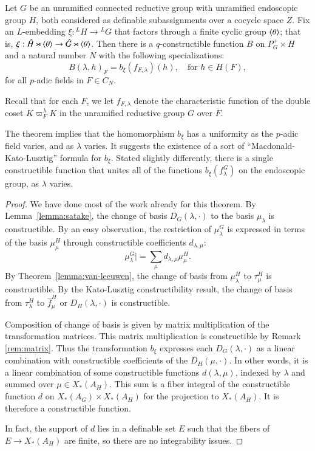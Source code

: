 \begin{theorem}\label{thm:B}
Let $G$ be an unramified connected reductive group with unramified endoscopic group $H$, both considered as definable
subassignments over a cocycle space $Z$.  Fix an $L$-embedding $\xi:{}^LH\to {}^LG$ that factors through a finite
cyclic group $\langle{\theta}\rangle$; that is, $\xi:\hat H\rtimes \langle{\theta}\rangle \to \hat G \rtimes \langle{\theta}\rangle$.
Then
there is a $q$-constructible function $B$ on $P^+_G\times H$ and a natural number $N$ with the following specializations:
\[
B(\lambda,h)_F = b_\xi(f_{F,\lambda})(h),\quad \text{for } h\in H(F),
\]
for all $p$-adic fields in $F\in C_N$.  
\end{theorem}

Recall that for each $F$, we let  $f_{F,\lambda}$ denote the characteristic function
of the double coset $K\varpi_F^\lambda K$ in the unramified reductive group $G$ over $F$.

The theorem implies that the homomorphism $b_\xi$ has a uniformity as the $p$-adic field
varies, and as $\lambda$ varies.  It suggests the existence of a sort of ``Macdonald-Kato-Lusztig''
formula for $b_\xi$.
Stated slightly differently, there is a single constructible function that unites
all of the functions $b_\xi (f^G_\lambda)$ on the endoscopic group, as $\lambda$ varies.

\begin{proof}
We have done most of the work already for this theorem.
By Lemma~\ref{lemma:satake}, the change of basis $D_G(\lambda,\cdot)$ to the basis $\mu_\lambda$
is constructible.  By an easy observation, the restriction of $\mu^G_\lambda$ is expressed in terms of the basis $\mu^H_\mu$ through
constructible coefficients $d_{\lambda,\mu}$:
\[
\mu^G_\lambda| = \sum_{\mu} d_{\lambda,\mu} \mu^H_\mu.
\]
By Theorem~\ref{lemma:van-leeuwen}, the change of basis from $\mu^H_\lambda$ to $\tau^H_\mu$ is constructible.
By the Kato-Lusztig constructibility result, the change of basis from 
$\tau^H_\lambda$ to $\hat f^H_\mu$ or $D_H(\lambda,\cdot)$ is constructible.  

Composition of change of basis is given by matrix multiplication of the transformation matrices.
This matrix multiplication is constructible by Remark \ref{rem:matrix}.  Thus the transformation $b_\xi$
expresses each $D_G(\lambda,\cdot)$ as a linear combination with constructible coefficients
of the $D_H(\mu,\cdot)$.   In other words, it is a linear combination of some constructible functions
$d(\lambda,\mu)$, indexed by $\lambda$ and summed over $\mu\in X_*(A_H)$.  This sum
is a fiber integral of the constructible function $d$ on $X_*(A_G)\times X_*(A_H)$ for the
projection to $X_*(A_H)$.  It is therefore a constructible function.

In fact, the support of $d$ lies in a definable set $E$ such that the fibers of $E\to X_*(A_H)$
are finite, so there are no integrability issues.
\end{proof}

